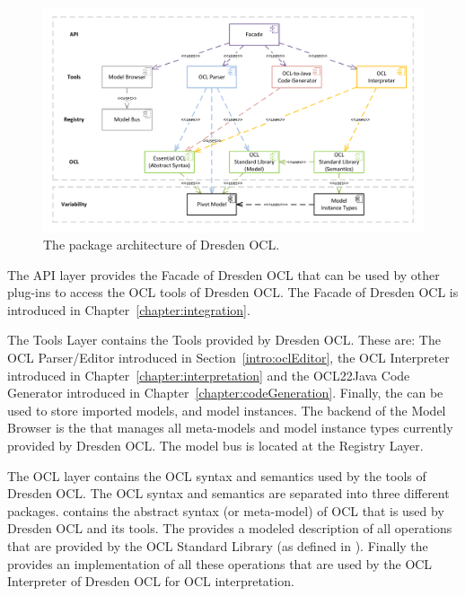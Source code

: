 \begin{figure}[!b]
	\centering
	\includegraphics[width=1.0\linewidth]{figures/architecture/modules}
	\caption{The package architecture of Dresden OCL.}
	\label{pic:architecture:modules}
\end{figure}

The API layer provides the Facade of Dresden OCL that can be used by other
plug-ins to access the \acs{OCL} tools of Dresden OCL. The Facade of Dresden OCL
is introduced in Chapter~\ref{chapter:integration}.

The Tools Layer contains the Tools provided by Dresden OCL. These are: The
\acs{OCL} Parser/Editor introduced in Section~\ref{intro:oclEditor}, the
\acs{OCL} Interpreter introduced in Chapter~\ref{chapter:interpretation} and the
\acs{OCL}22Java Code Generator introduced in
Chapter~\ref{chapter:codeGeneration}. Finally, the  can
be used to store imported models, and model instances. The backend of the Model
Browser is the  that manages all meta-models and model
instance types currently provided by Dresden OCL. The model bus is located at the
Registry Layer.

The \acs{OCL} layer contains the \acs{OCL} syntax and semantics used by the
tools of Dresden OCL. The \acs{OCL} syntax and semantics are separated into
three different packages.  contains the abstract syntax
(or meta-model) of \acs{OCL} that is used by Dresden OCL and its tools. The
 provides a modeled description of all
operations that are provided by the \acs{OCL} Standard Library (as defined in
\cite[Ch.~11]{spec:OCL2-2}). Finally the  provides an implementation of all these operations that are used by
the \acs{OCL} Interpreter of Dresden OCL for \acs{OCL} interpretation.

